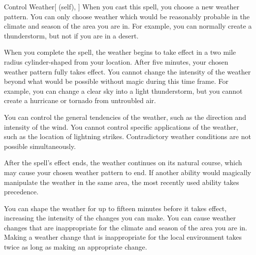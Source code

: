 \lowercase{\hypertarget{spell:Control Weather}{}}\label{spell:Control Weather}
\begin{attuneability}[Rank 4]{\hypertarget{spell:Control Weather}{Control Weather}}[ (self), ]
\targetrule
When you cast this spell, you choose a new weather pattern.
You can only choose weather which would be reasonably probable in the climate and season of the area you are in.
For example, you can normally create a thunderstorm, but not if you are in a desert.

When you complete the spell, the weather begins to take effect in a two mile radius cylinder-shaped  from your location.
After five minutes, your chosen weather pattern fully takes effect.
You cannot change the intensity of the weather beyond what would be possible without magic during this time frame.
For example, you can change a clear sky into a light thunderstorm, but you cannot create a hurricane or tornado from untroubled air.

You can control the general tendencies of the weather, such as the direction and intensity of the wind.
You cannot control specific applications of the weather, such as the location of lightning strikes.
Contradictory weather conditions are not possible simultaneously.

After the spell's effect ends, the weather continues on its natural course, which may cause your chosen weather pattern to end.
If another ability would magically manipulate the weather in the same area, the most recently used ability takes precedence.

\rankline
{} You can shape the weather for up to fifteen minutes before it takes effect, increasing the intensity of the changes you can make.
 You can cause weather changes that are inappropriate for the climate and season of the area you are in.
Making a weather change that is inappropriate for the local environment takes twice as long as making an appropriate change.
\end{attuneability}
\vspace{0.25em}



